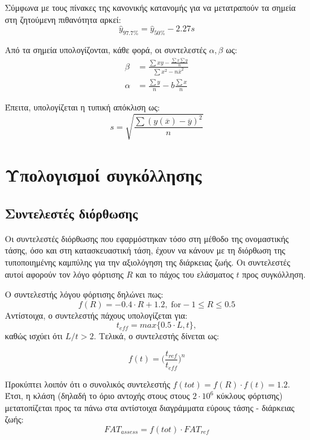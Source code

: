 \documentclass{article}
\begin{document}
Σύμφωνα με τους πίνακες της κανονικής κατανομής για να μετατραπούν τα σημεία στη ζητούμενη πιθανότητα αρκεί:
\begin{equation}
    \hat{y}_{97.7\%} = \hat{y}_{50\%} - 2.27s
\end{equation}

Από τα σημεία υπολογίζονται, κάθε φορά, οι συντελεστές $\alpha, \beta$ ως:
\begin{align}
    \beta &= \frac{\sum xy - \frac{\sum x \sum y}{n}}{\sum x^2 -n\overline{x}^2}\\
    \alpha &= \frac{\sum y}{n} - b\frac{\sum x}{n}
\end{align} 

Έπειτα, υπολογίζεται η τυπική απόκλιση ως:
\begin{equation}
    s = \sqrt{\frac{\sum (y(\overline{x}) - \overline{y})^2}{n}}
\end{equation}




\section{Υπολογισμοί συγκόλλησης}

\subsection{Συντελεστές διόρθωσης} 
Οι συντελεστές διόρθωσης που εφαρμόστηκαν τόσο στη μέθοδο της ονομαστικής τάσης, όσο και στη κατασκευαστική τάση, έχουν να κάνουν με τη διόρθωση της τυποποιημένης καμπύλης για την αξιολόγηση της διάρκειας ζωής. Οι συντελεστές αυτοί αφορούν τον λόγο φόρτισης $R$ και το πάχος του ελάσματος $t$ προς συγκόλληση.
\par Ο συντελεστής λόγου φόρτισης δηλώνει πως:
\begin{equation}
    f(R) = -0.4\cdot R + 1.2,\; \text{for} -1\le R \le 0.5
\end{equation}
Αντίστοιχα, ο συντελεστής πάχους υπολογίζεται για:
\begin{equation}
    t_{eff} = max\{0.5\cdot L, t\},
\end{equation}
καθώς ισχύει ότι $L/t>2$. Τελικά, ο συντελεστής δίνεται ως:

\begin{equation}
    f(t) = \bigg(\frac{t_{ref}}{t_{eff}}\bigg)^n
\end{equation}

Προκύπτει λοιπόν ότι ο συνολικός συντελεστής $f(tot) = f(R)\cdot f(t) = 1.2$. Έτσι, η κλάση (δηλαδή το όριο αντοχής στους στους $2\cdot 10^6$ κύκλους φόρτισης) μετατοπίζεται προς τα πάνω στα αντίστοιχα διαγράμματα εύρους τάσης - διάρκειας ζωής:
\begin{equation}
    FAT_{assess} = f(tot) \cdot FAT_{ref}
\end{equation}
\end{document}
